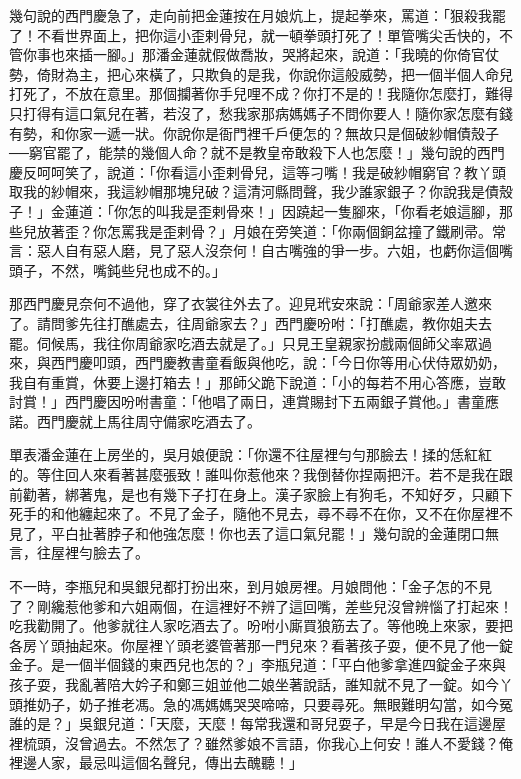 幾句說的西門慶急了，走向前把金蓮按在月娘炕上，提起拳來，罵道：「狠殺我罷了！不看世界面上，把你這小歪剌骨兒，就一頓拳頭打死了！單管嘴尖舌快的，不管你事也來插一腳。」那潘金蓮就假做喬妝，哭將起來，說道：「我曉的你倚官仗勢，倚財為主，把心來橫了，只欺負的是我，你說你這般威勢，把一個半個人命兒打死了，不放在意里。那個攔著你手兒哩不成？你打不是的！我隨你怎麼打，難得只打得有這口氣兒在著，若沒了，愁我家那病媽媽子不問你要人！隨你家怎麼有錢有勢，和你家一遞一狀。你說你是衙門裡千戶便怎的？無故只是個破紗帽債殼子──窮官罷了，能禁的幾個人命？就不是教皇帝敢殺下人也怎麼！」幾句說的西門慶反呵呵笑了，說道：「你看這小歪剌骨兒，這等刁嘴！我是破紗帽窮官？教丫頭取我的紗帽來，我這紗帽那塊兒破？這清河縣問聲，我少誰家銀子？你說我是債殼子！」金蓮道：「你怎的叫我是歪剌骨來！」因蹺起一隻腳來，「你看老娘這腳，那些兒放著歪？你怎罵我是歪剌骨？」月娘在旁笑道：「你兩個銅盆撞了鐵刷帚。常言：惡人自有惡人磨，見了惡人沒奈何！自古嘴強的爭一步。六姐，也虧你這個嘴頭子，不然，嘴鈍些兒也成不的。」

那西門慶見奈何不過他，穿了衣裳往外去了。迎見玳安來說：「周爺家差人邀來了。請問爹先往打醮處去，往周爺家去？」西門慶吩咐：「打醮處，教你姐夫去罷。伺候馬，我往你周爺家吃酒去就是了。」只見王皇親家扮戲兩個師父率眾過來，與西門慶叩頭，西門慶教書童看飯與他吃，說：「今日你等用心伏侍眾奶奶，我自有重賞，休要上邊打箱去！」那師父跪下說道：「小的每若不用心答應，豈敢討賞！」西門慶因吩咐書童：「他唱了兩日，連賞賜封下五兩銀子賞他。」書童應諾。西門慶就上馬往周守備家吃酒去了。

單表潘金蓮在上房坐的，吳月娘便說：「你還不往屋裡勻勻那臉去！揉的恁紅紅的。等住回人來看著甚麼張致！誰叫你惹他來？我倒替你捏兩把汗。若不是我在跟前勸著，綁著鬼，是也有幾下子打在身上。漢子家臉上有狗毛，不知好歹，只顧下死手的和他纏起來了。不見了金子，隨他不見去，尋不尋不在你，又不在你屋裡不見了，平白扯著脖子和他強怎麼！你也丟了這口氣兒罷！」幾句說的金蓮閉口無言，往屋裡勻臉去了。

不一時，李瓶兒和吳銀兒都打扮出來，到月娘房裡。月娘問他：「金子怎的不見了？剛纔惹他爹和六姐兩個，在這裡好不辨了這回嘴，差些兒沒曾辨惱了打起來！吃我勸開了。他爹就往人家吃酒去了。吩咐小廝買狼筋去了。等他晚上來家，要把各房丫頭抽起來。你屋裡丫頭老婆管著那一門兒來？看著孩子耍，便不見了他一錠金子。是一個半個錢的東西兒也怎的？」李瓶兒道：「平白他爹拿進四錠金子來與孩子耍，我亂著陪大妗子和鄭三姐並他二娘坐著說話，誰知就不見了一錠。如今丫頭推奶子，奶子推老馮。急的馮媽媽哭哭啼啼，只要尋死。無眼難明勾當，如今冤誰的是？」吳銀兒道：「天麼，天麼！每常我還和哥兒耍子，早是今日我在這邊屋裡梳頭，沒曾過去。不然怎了？雖然爹娘不言語，你我心上何安！誰人不愛錢？俺裡邊人家，最忌叫這個名聲兒，傳出去醜聽！」

